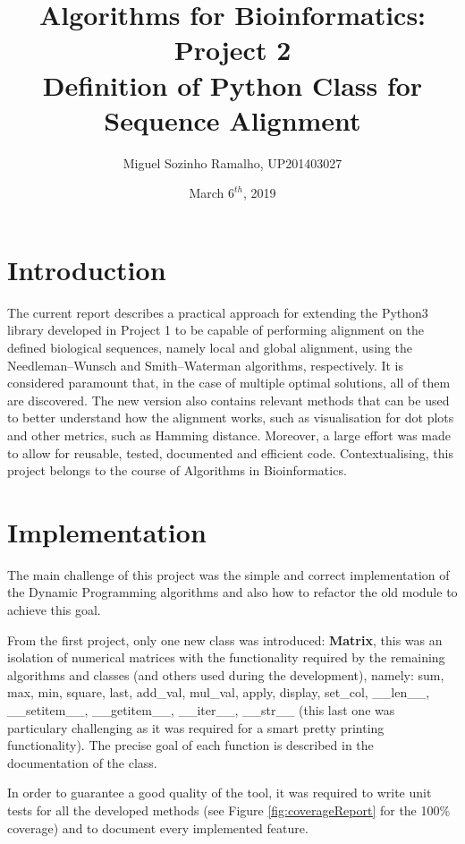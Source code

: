 \documentclass[11pt]{article}
\begin{document}
\author{Miguel Sozinho Ramalho, UP201403027}
\date{March $6^{th}$, 2019}
\title{Algorithms for Bioinformatics: Project 2\\Definition of Python Class for Sequence Alignment}
\maketitle


\section{Introduction}
The current report describes a practical approach for extending the Python3 library developed in Project 1 to be capable of performing alignment on the defined biological sequences, namely local and global alignment, using the Needleman–Wunsch and Smith–Waterman algorithms, respectively. It is considered paramount that, in the case of multiple optimal solutions, all of them are discovered. The new version also contains relevant methods that can be used to better understand how the alignment works, such as visualisation for dot plots and other metrics, such as Hamming distance. Moreover, a large effort was made to allow for reusable, tested, documented and efficient code. Contextualising, this project belongs to the course of Algorithms in Bioinformatics.

\section{Implementation}
The main challenge of this project was the simple and correct implementation of the Dynamic Programming algorithms and also how to refactor the old module to achieve this goal. 

From the first project, only one new class was introduced: \textbf{Matrix}, this was an isolation of numerical matrices with the functionality required by the remaining algorithms and classes (and others used during the development), namely: sum, max, min, square, last, add\_val, mul\_val, apply, display, set\_col, \_\_len\_\_, \_\_setitem\_\_, \_\_getitem\_\_, \_\_iter\_\_, \_\_str\_\_ (this last one was particulary challenging as it was required for a smart pretty printing functionality). The precise goal of each function is described in the documentation of the class. 

In order to guarantee a good quality of the tool, it was required to write unit tests for all the developed methods (see Figure \ref{fig:coverageReport} for the 100\% coverage) and to document every implemented feature. 
\end{document}
